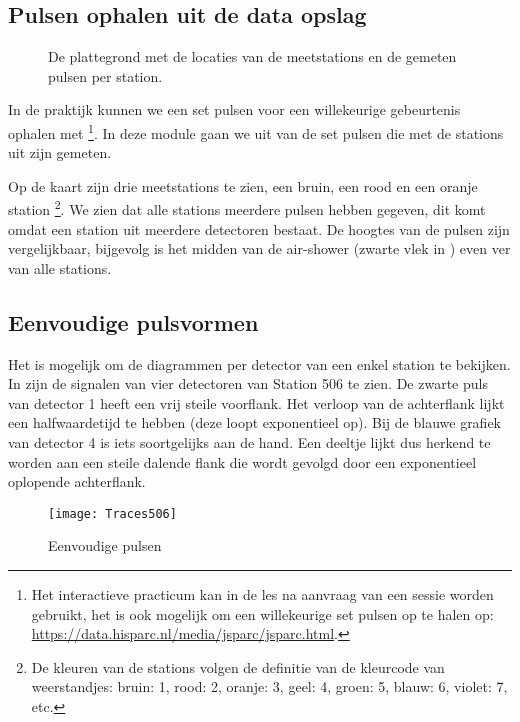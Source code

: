 \subsection{Pulsen ophalen uit de \hisparc data opslag}

\begin{figure}[ht]
    \centering
    \caption{De plattegrond met de locaties van de meetstations
             en de gemeten pulsen per station.}
    \label{fig:coincidence}
\end{figure}

In de praktijk kunnen we een set pulsen voor een willekeurige
gebeurtenis ophalen met \jsparc%
\footnote{Het interactieve practicum \jsparc kan in de les na aanvraag
van een sessie worden gebruikt, het is ook mogelijk om een willekeurige
set pulsen op te halen op:
\url{https://data.hisparc.nl/media/jsparc/jsparc.html}.%
}. In deze module gaan we uit van de set pulsen die met de stations
uit  zijn gemeten.

Op de kaart zijn drie meetstations te zien, een bruin, een rood en een
oranje station%
\footnote{De kleuren van de stations volgen de definitie van de
kleurcode van weerstandjes: bruin: 1, rood: 2, oranje: 3, geel: 4,
groen: 5, blauw: 6, violet: 7, etc. %
}. We zien dat alle stations meerdere pulsen hebben gegeven, dit komt
omdat een station uit meerdere detectoren bestaat. De hoogtes van de
pulsen zijn vergelijkbaar, bijgevolg is het midden van de air-shower
(zwarte vlek in ) even ver van alle stations.


\subsection{Eenvoudige pulsvormen}

Het is mogelijk om de diagrammen per detector van een enkel station
te bekijken. In  zijn de signalen
van vier detectoren van Station 506 te zien. De zwarte puls van detector
1 heeft een vrij steile voorflank. Het verloop van de achterflank
lijkt een halfwaardetijd te hebben (deze loopt exponentieel op). Bij
de blauwe grafiek van detector 4 is iets soortgelijks aan de hand.
Een deeltje lijkt dus herkend te worden aan een steile dalende flank
die wordt gevolgd door een exponentieel oplopende achterflank.

\begin{figure}[ht]
    \centering
    \texttt{[image: Traces506]}
    \caption{Eenvoudige pulsen}
    \label{fig:Eenvoudige-pulsen}
\end{figure}


